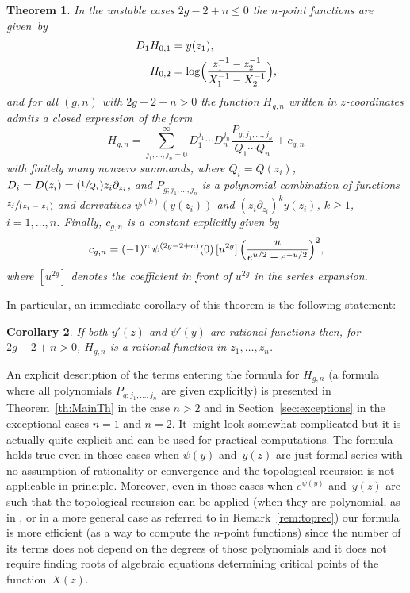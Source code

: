 \documentclass[JEP,XML,SOM,Unicode,NoEqCountersInSection,NoFloatCountersInSection]{cedram}
\newcommand{\Psfrac}[2]{(\sfrac{#1}{#2})}
\newcommand{\spfrac}[2]{\sfrac{#1}{(#2)}}
\theoremstyle{plain}
\newtheorem{theorem}{Theorem}[section]
\newtheorem{corollary}[theorem]{Corollary}
\theoremstyle{definition}
\theoremstyle{remark}
\begin{document}
\begin{theorem}\label{th:intro}
In the unstable cases $2g-2+n\le0$ the $n$-point functions are given~by
\begin{align}
D_1 H_{0,1}&=y(z_1), \notag%
\\
H_{0,2}&=\log\Bigl(\frac{z_1^{-1}-z_2^{-1}}{X_1^{-1}-X_2^{-1}}\Bigr),\label{eq:H02}
\end{align}
and for all $(g,n)$ with $2g-2+n>0$ the function $H_{g,n}$ written in $z$-coordinates admits a closed expression of the form
\begin{equation}\label{eqTh1}
H_{g,n}=\sum_{j_1,\dots,j_n = 0}^\infty D_1^{j_1}\cdots D_n^{j_n}
\frac{P_{g;j_1,\dots,j_n}}{Q_1\cdots Q_n}+c_{g,n}
\end{equation}
with finitely many nonzero summands, where $Q_i=Q(z_i)$, $D_i=D(z_i)=\Psfrac1{Q_i}z_i\partial_{z_i}$, and $P_{g;j_1,\dots,j_n}$ is a polynomial combination of functions
$\spfrac{z_j}{z_i-z_j}$ and
derivatives $\psi^{(k)}(y(z_i))$ and
$\left(z_i\partial_{z_i}\right)^ky(z_i)$, $k\ge1$, $i=1,\dots, n$.
Finally, $c_{g,n}$ is a constant explicitly given by
\begin{equation*}
c_{g,n}=(-1)^n\,\psi^{(2g-2+n)}(0)\,[u^{2g}]\,\Bigl(\frac{u}{e^{u/2}-e^{-u/2}}\Bigr)^2,
\end{equation*}
where $[u^{2g}]$ denotes the coefficient in front of $u^{2g}$ in the series expansion.
\end{theorem}

In particular, an immediate corollary of this theorem is the following statement:

\begin{corollary}\mbox{}\hspace*{-2mm}
If both $y'(z)$ and $\psi'(y)$ are rational functions then, for \hbox{$2g\!-\!2\!+\!n\!>\!0$}, $H_{g,n}$ is a rational function in $z_1,\dots,z_n$.
\end{corollary}

An explicit description of the terms entering the formula for $H_{g,n}$ (\ie a formula where all polynomials $P_{g;j_1,\dots,j_n}$ are given explicitly) is presented in Theorem~\ref{th:MainTh} in the case $n>2$ and in Section~\ref{sec:exceptions} in the exceptional cases $n=1$ and $n=2$. It~might look somewhat complicated but it is actually quite explicit and can be used for practical computations. The formula holds true even in those cases when $\psi(y)$ and~$y(z)$ are just formal series with no assumption of rationality or convergence and the topological recursion is not applicable in principle. Moreover, even in those cases when $e^{\psi(y)}$ and~$y(z)$ are such that
the topological recursion can be applied (\eg when they are polynomial, as in \cite{ACEH-1,ACEH-2}, or in a more general case as referred to in Remark~\ref{rem:toprec}) our formula is more efficient (as a way to compute the $n$-point functions) since the number of its terms does not depend on the degrees of those polynomials and it does not require finding roots of algebraic equations determining critical points of the function~$X(z)$.
\end{document}
